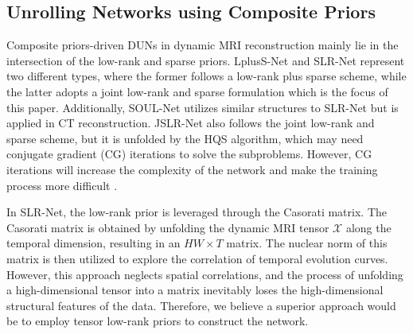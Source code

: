 \subsection{Unrolling Networks using Composite Priors}
Composite priors-driven DUNs in dynamic MRI reconstruction mainly lie in the intersection of the low-rank and sparse priors. LplusS-Net \cite{huang2021deep} and SLR-Net \cite{ref_slrnet} represent two different types, where the former follows a low-rank plus sparse scheme, while the latter adopts a joint low-rank and sparse formulation which is the focus of this paper. Additionally, SOUL-Net \cite{chen2023soul} utilizes similar structures to SLR-Net but is applied in CT reconstruction. JSLR-Net \cite{zhong2024jslrnet} also follows the joint low-rank and sparse scheme, but it is unfolded by the HQS algorithm, which may need conjugate gradient (CG) iterations to solve the subproblems. However, CG iterations will increase the complexity of the network and make the training process more difficult \cite{aggarwal2018modl}.

In SLR-Net, the low-rank prior is leveraged through the Casorati matrix. The Casorati matrix is obtained by unfolding the dynamic MRI tensor $\mathcal{X}$ along the temporal dimension, resulting in an $HW \times T$ matrix. The nuclear norm of this matrix is then utilized to explore the correlation of temporal evolution curves. However, this approach neglects spatial correlations, and the process of unfolding a high-dimensional tensor into a matrix inevitably loses the high-dimensional structural features of the data. Therefore, we believe a superior approach would be to employ tensor low-rank priors to construct the network. 



